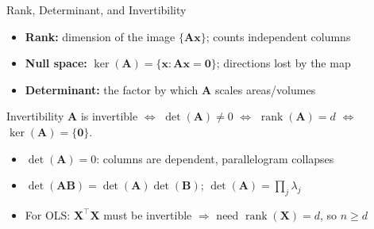 \documentclass[aspectratio=169, professionalfonts]{beamer}
\newcommand{\rank}{\operatorname{rank}}
\begin{document}
\begin{frame}{Rank, Determinant, and Invertibility}

\begin{itemize}
  \item \textbf{Rank:} dimension of the image $\{\mathbf{A}\mathbf{x}\}$; counts independent columns
  \item \textbf{Null space:} $\ker(\mathbf{A}) = \{\mathbf{x} : \mathbf{A}\mathbf{x} = \mathbf{0}\}$; directions lost by the map
  \item \textbf{Determinant:} the factor by which $\mathbf{A}$ scales areas/volumes
\end{itemize}

\bigskip

\begin{block}{Invertibility}
$\mathbf{A}$ is invertible $\iff$ $\det(\mathbf{A}) \neq 0$ $\iff$ $\rank(\mathbf{A}) = d$ $\iff$ $\ker(\mathbf{A}) = \{\mathbf{0}\}$.
\end{block}

\bigskip

\begin{itemize}
  \item $\det(\mathbf{A}) = 0$: columns are dependent, parallelogram collapses
  \item $\det(\mathbf{A}\mathbf{B}) = \det(\mathbf{A})\det(\mathbf{B})$; \quad $\det(\mathbf{A}) = \prod_j\lambda_j$
  \item For OLS: $\mathbf{X}^\top\mathbf{X}$ must be invertible $\Rightarrow$ need $\rank(\mathbf{X}) = d$, so $n \geq d$
\end{itemize}

\end{frame}
\end{document}
